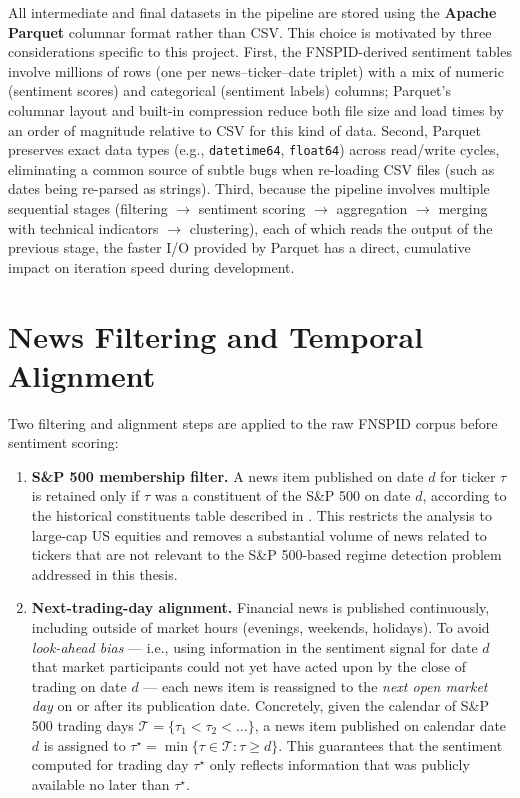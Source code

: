 All intermediate and final datasets in the pipeline are stored using the
\textbf{Apache Parquet} columnar format rather than CSV. This choice is
motivated by three considerations specific to this project. First, the
FNSPID-derived sentiment tables involve millions of rows (one per
news--ticker--date triplet) with a mix of numeric (sentiment scores) and
categorical (sentiment labels) columns; Parquet's columnar layout and
built-in compression reduce both file size and load times by an order of
magnitude relative to CSV for this kind of data. Second, Parquet preserves
exact data types (e.g., \texttt{datetime64}, \texttt{float64}) across
read/write cycles, eliminating a common source of subtle bugs when
re-loading CSV files (such as dates being re-parsed as strings). Third,
because the pipeline involves multiple sequential stages
(filtering $\to$ sentiment scoring $\to$ aggregation $\to$ merging with
technical indicators $\to$ clustering), each of which reads the output of
the previous stage, the faster I/O provided by Parquet has a direct,
cumulative impact on iteration speed during development.

\section{News Filtering and Temporal Alignment}
\label{sec:meth-filtering}

Two filtering and alignment steps are applied to the raw FNSPID corpus
before sentiment scoring:

\begin{enumerate}
  \item \textbf{S\&P 500 membership filter.} A news item published on
  date $d$ for ticker $\tau$ is retained only if $\tau$ was a constituent
  of the S\&P 500 on date $d$, according to the historical constituents
  table described in . This restricts the analysis to
  large-cap US equities and removes a substantial volume of news related
  to tickers that are not relevant to the S\&P 500-based regime detection
  problem addressed in this thesis.

  \item \textbf{Next-trading-day alignment.} Financial news is published
  continuously, including outside of market hours (evenings, weekends,
  holidays). To avoid \emph{look-ahead bias} --- i.e., using information
  in the sentiment signal for date $d$ that market participants could not
  yet have acted upon by the close of trading on date $d$ --- each news
  item is reassigned to the \emph{next open market day} on or after its
  publication date. Concretely, given the calendar of S\&P 500 trading
  days $\mathcal{T} = \{\tau_1 < \tau_2 < \dots\}$, a news item published
  on calendar date $d$ is assigned to
  $\tau^\star = \min\{\tau \in \mathcal{T} : \tau \ge d\}$. This guarantees
  that the sentiment computed for trading day $\tau^\star$ only reflects
  information that was publicly available no later than $\tau^\star$.
\end{enumerate}

